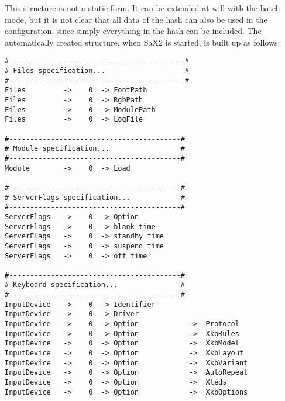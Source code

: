 This structure is not a static form. It can be extended at will with the batch
mode, but it is not clear that all data of the hash can also be used in the
configuration, since simply everything in the hash can be included. The
automatically created structure, when SaX2 is started, is built up as follows:
\\
\begin{verbatim}
#------------------------------------------#
# Files specification...                   #
#------------------------------------------#
Files         ->    0  -> FontPath
Files         ->    0  -> RgbPath
Files         ->    0  -> ModulePath
Files         ->    0  -> LogFile

#-----------------------------------------#
# Module specification...                 #
#-----------------------------------------#
Module        ->    0  -> Load

#-----------------------------------------#
# ServerFlags specification...            #
#-----------------------------------------#
ServerFlags   ->    0  -> Option
ServerFlags   ->    0  -> blank time
ServerFlags   ->    0  -> standby time
ServerFlags   ->    0  -> suspend time
ServerFlags   ->    0  -> off time

#-----------------------------------------#
# Keyboard specification...               #
#-----------------------------------------#
InputDevice   ->    0  -> Identifier
InputDevice   ->    0  -> Driver
InputDevice   ->    0  -> Option            ->  Protocol
InputDevice   ->    0  -> Option            ->  XkbRules
InputDevice   ->    0  -> Option            ->  XkbModel
InputDevice   ->    0  -> Option            ->  XkbLayout
InputDevice   ->    0  -> Option            ->  XkbVariant
InputDevice   ->    0  -> Option            ->  AutoRepeat
InputDevice   ->    0  -> Option            ->  Xleds
InputDevice   ->    0  -> Option            ->  XkbOptions


\end{verbatim}

